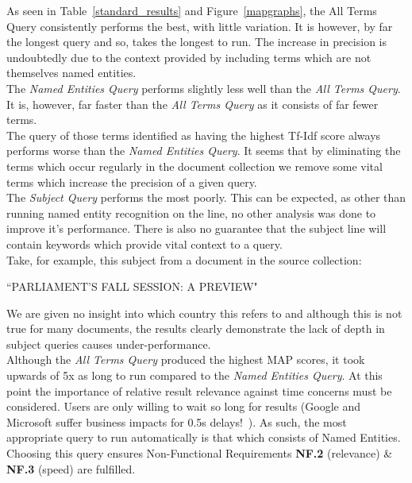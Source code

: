\documentclass{l4proj}
\begin{document}
As seen in Table~\ref{standard_results} and Figure~\ref{mapgraphs}, the All Terms Query consistently performs the best, with little variation. It is however, by far the longest query and so, takes the longest to run. The increase in precision is undoubtedly due to the context provided by including terms which are not themselves named entities. \\
The \textit{Named Entities Query} performs slightly less well than the \textit{All Terms Query}. It is, however, far faster than the \textit{All Terms Query} as it consists of far fewer terms. \\
The query of those terms identified as having the highest Tf-Idf score always performs worse than the \textit{Named Entities Query}. It seems that by eliminating the terms which occur regularly in the document collection we remove some vital terms which increase the precision of a given query. \\
The \textit{Subject Query} performs the most poorly. This can be expected, as other than running named entity recognition on the line, no other analysis was done to improve it's performance. There is also no guarantee that the subject line will contain keywords which provide vital context to a query.\\
Take, for example, this subject from a document in the source collection:
\begin{center}``PARLIAMENT'S FALL SESSION: A PREVIEW"\end{center}
We are given no insight into which country this refers to and although this is not true for many documents, the results clearly demonstrate the lack of depth in subject queries causes under-performance.\\
Although the \textit{All Terms Query} produced the highest MAP scores, it took upwards of 5x as long to run compared to the \textit{Named Entities Query}. At this point the importance of relative result relevance against time concerns must be considered. Users are only willing to wait so long for results (Google and Microsoft suffer business impacts for 0.5s delays!~\cite{performance}). 
As such, the most appropriate query to run automatically is that which consists of Named Entities. Choosing this query ensures Non-Functional Requirements \textbf{NF.2} (relevance) \& \textbf{NF.3} (speed) are fulfilled.
\end{document}
